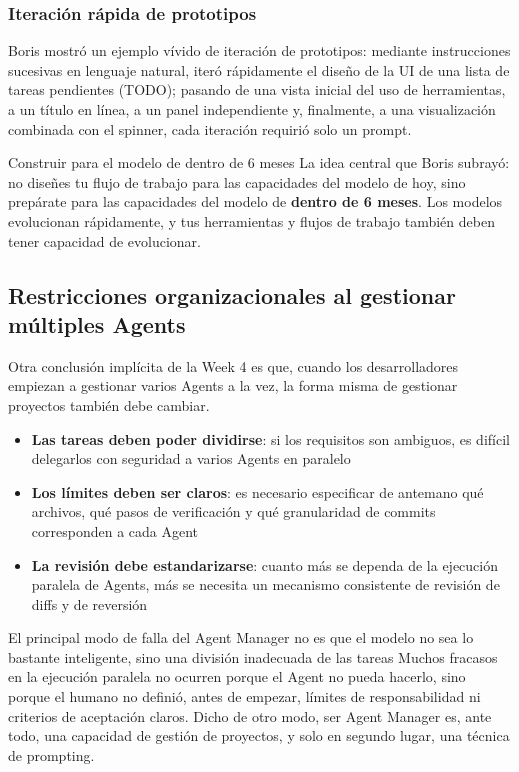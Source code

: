 \subsubsection{Iteración rápida de prototipos}

Boris mostró un ejemplo vívido de iteración de prototipos: mediante instrucciones sucesivas en lenguaje natural, iteró rápidamente el diseño de la UI de una lista de tareas pendientes (TODO); pasando de una vista inicial del uso de herramientas, a un título en línea, a un panel independiente y, finalmente, a una visualización combinada con el spinner, cada iteración requirió solo un prompt.

\begin{importantbox}{Construir para el modelo de dentro de 6 meses}
La idea central que Boris subrayó: no diseñes tu flujo de trabajo para las capacidades del modelo de hoy, sino prepárate para las capacidades del modelo de \textbf{dentro de 6 meses}. Los modelos evolucionan rápidamente, y tus herramientas y flujos de trabajo también deben tener capacidad de evolucionar.
\end{importantbox}

\subsection{Restricciones organizacionales al gestionar múltiples Agents}

Otra conclusión implícita de la Week 4 es que, cuando los desarrolladores empiezan a gestionar varios Agents a la vez, la forma misma de gestionar proyectos también debe cambiar.

\begin{itemize}
    \item \textbf{Las tareas deben poder dividirse}: si los requisitos son ambiguos, es difícil delegarlos con seguridad a varios Agents en paralelo
    \item \textbf{Los límites deben ser claros}: es necesario especificar de antemano qué archivos, qué pasos de verificación y qué granularidad de commits corresponden a cada Agent
    \item \textbf{La revisión debe estandarizarse}: cuanto más se dependa de la ejecución paralela de Agents, más se necesita un mecanismo consistente de revisión de diffs y de reversión
\end{itemize}

\begin{warningbox}{El principal modo de falla del Agent Manager no es que el modelo no sea lo bastante inteligente, sino una división inadecuada de las tareas}
Muchos fracasos en la ejecución paralela no ocurren porque el Agent no pueda hacerlo, sino porque el humano no definió, antes de empezar, límites de responsabilidad ni criterios de aceptación claros. Dicho de otro modo, ser Agent Manager es, ante todo, una capacidad de gestión de proyectos, y solo en segundo lugar, una técnica de prompting.
\end{warningbox}


